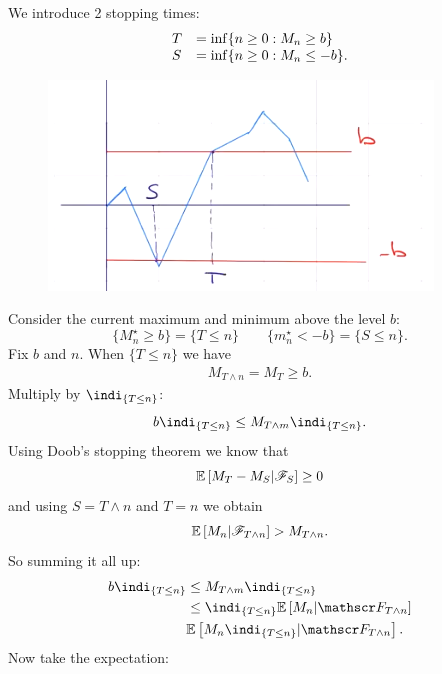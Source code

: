 \documentclass{report}
\begin{document}
\begin{fancyproof}
	We introduce 2 stopping times: 
	\begin{equation*}
		\begin{array}{l l}
			T&=\inf\{n\geq0:M_{n}\geq b\}\\
			S&=\inf\{n\geq0:M_{n}\leq-b\}.
		\end{array}
	\end{equation*}
	\begin{figure}[H]
		\centering
		\includegraphics[width=0.6\linewidth]{screenshot019}
		\label{fig:screenshot019}
	\end{figure}
	Consider the current maximum and minimum above the level $b$:
	\begin{equation*}
		\{M^{\star}_{n}\geq b\}=\{T\leq n\}\qquad	\{m^{\star}_{n}<-b\}=\{S\leq n\}.
	\end{equation*}
	Fix $b$ and $n$. When $\{T\leq n\}$ we have
	\begin{align*}
		M_{T\wedge n}=M_{T}\geq b.
	\end{align*}
	Multiply by $\indi_{\{T\leq n\}}$:
	\begin{equation*}
		b\indi_{\{T\leq n\}}\leq M_{T\wedge m}\indi_{\{T\leq n\}}.
	\end{equation*}
	Using Doob's stopping theorem we know that 
	\begin{equation*}
		\mathbb{E}\left[M_{T}-M_{S}|\mathscr{F}_{S}\right]\geq0
	\end{equation*}
	and using $S=T\wedge n$ and $T=n$ we obtain
	\begin{equation*}
		\mathbb{E}\left[M_{n}|\mathscr{F}_{T\wedge n}\right]>M_{T\wedge n}.
	\end{equation*}
	So summing it all up:
	\begin{align*}
		b\indi_{\{T\leq n\}}&\leq M_{T\wedge m}\indi_{\{T\leq n\}}\\
		&\leq\indi_{\{T\leq n\}}\ev\left[M_{n}|\F_{T\wedge n}\right]\\
		&\ev\left[M_{n}\indi_{\{T\leq n\}}|\F_{T\wedge n}\right].
	\end{align*}
	Now take the expectation:
	\begin{align*}

\end{align*}
\end{fancyproof}
\end{document}
